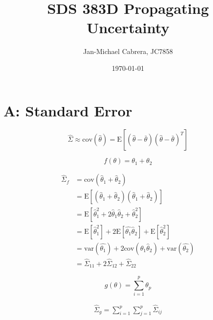 \documentclass[12pt]{article}
\newcommand{\cov}{\text{cov}}
\newcommand{\var}{\text{var}}
\newcommand{\E}{\text{E}}
\begin{document}
    \title{SDS 383D Propagating Uncertainty}
    \author{Jan-Michael Cabrera, JC7858}
    \date{\today}
    \maketitle

    \section*{A: Standard Error}

        \begin{equation}
            \hat{\Sigma} \approx \cov(\hat{\theta}) = \E \left[ (\hat{\theta} - \bar{\theta})(\hat{\theta} - \bar{\theta})^T\right]
        \end{equation}

        \begin{equation}
            f(\theta) = \theta_1 + \theta_2
        \end{equation}

        \begin{align}
            \hat{\Sigma}_f &= \cov(\hat{\theta}_1+\hat{\theta}_2) \\
            &= \E \left[ (\hat{\theta}_1 + \hat{\theta}_2) (\hat{\theta}_1 + \hat{\theta}_2)\right] \\
            &= \E \left[ \hat{\theta}_1^2 + 2 \hat{\theta}_1 \hat{\theta}_2 + \hat{\theta}_2^2\right] \\
            &= \E \left [ \hat{\theta}_1^2 \right] + 2 \E \left [ \hat{\theta_1} \hat{\theta}_2 \right ]+ \E \left [ \hat{\theta}_2^2 \right] \\
            & = \var(\hat{\theta_1}) + 2 \cov(\hat{\theta}_1 \hat{\theta}_2) + \var(\hat{\theta_2}) \\
            &= \hat{\Sigma}_{11} + 2 \hat{\Sigma}_{12} + \hat{\Sigma}_{22}
        \end{align}

        \begin{equation}
            g(\theta) = \sum_{i=1}^p \theta_p
        \end{equation}

        \begin{align}
            \hat{\Sigma}_g = \sum_{i=1}^p \sum_{j=1}^p \hat{\Sigma}_{ij}
        \end{align}
\end{document}

